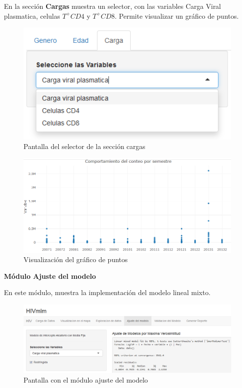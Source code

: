 En la secci\'on \textbf{Cargas} muestra un selector, con las variables Carga Viral plasmatica, celulas $T^{+}CD4$ y $T^{+}CD8$. Permite visualizar un gr\'afico de puntos.

\begin{figure}[H]
\centering
\includegraphics[scale=0.6]{exploraCarg.PNG}
\caption{Pantalla del selector de la secci\'on cargas}
\end{figure}

\begin{figure}[H]
\centering
\includegraphics[scale=0.6]{CVP.PNG}
\caption{Visualizaci\'on del gr\'afico de puntos}
\end{figure}

 \noindent
\textbf{M\'odulo Ajuste del modelo}

En este m\'odulo, muestra la implementaci\'on del modelo lineal mixto.

\begin{figure}[H]
\centering
\includegraphics[scale=0.5]{ajusteModel.PNG}
\caption{Pantalla con el m\'odulo ajuste del modelo}
\end{figure}

